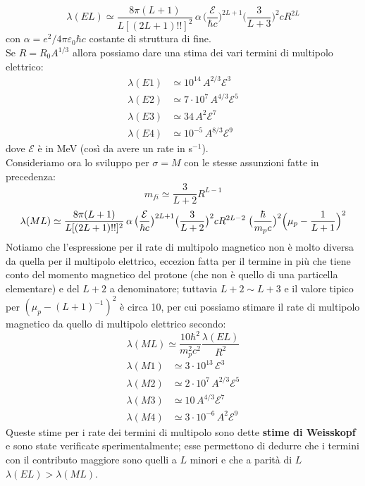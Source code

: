 $$\lambda(EL)\simeq \frac{8\pi(L+1)}{L[(2L+1)!!]^2}\,\alpha\,\bigl(\frac{\mathcal{E}}{\hbar c} \bigr)^{2L+1}\bigl(\frac{3}{L+3} \bigr)^2cR^{2L}$$
con $\alpha = e^2/4\pi\varepsilon_0\hbar c$ costante di struttura di fine.\\
Se $R=R_0A^{1/3}$ allora possiamo dare una stima dei vari termini di multipolo elettrico:
\begin{displaymath}
\begin{aligned}
\lambda(E1)&\simeq 10^{14} \, A^{2/3} \mathcal{E}^3 \\
\lambda(E2)&\simeq 7\cdot10^{7} \, A^{4/3} \mathcal{E}^5 \\
\lambda(E3)&\simeq 34 \, A^{2} \mathcal{E}^7 \\
\lambda(E4)&\simeq 10^{-5} \, A^{8/3} \mathcal{E}^9
\end{aligned}
\end{displaymath}
dove $\mathcal{E}$ è in MeV (così da avere un rate in s$^{-1}$).\\
Consideriamo ora lo sviluppo per $\sigma =M$ con le stesse assunzioni fatte in precedenza:
$$m_{fi}\simeq \frac{3}{L+2}R^{L-1}$$
$$\lambda(ML) \simeq \frac{8\pi(L+1)}{L[(2L+1)!!]^2}\,\alpha\,\bigl(\frac{\mathcal{E}}{\hbar c} \bigr)^{2L+1}\bigl(\frac{3}{L+2} \bigr)^2cR^{2L-2}\;\bigl(\frac{\hbar}{m_p c}\bigr)^2\Bigl ( \mu_p - \frac{1}{L+1} \Bigr )^2$$
Notiamo che l'espressione per il rate di multipolo magnetico non è molto diversa da quella per il multipolo elettrico, eccezion fatta per il termine in più che tiene conto del momento magnetico del protone (che non è quello di una particella elementare) e del $L+2$ a denominatore; tuttavia $L+2\sim L+3$ e il valore tipico per $(\mu_p-(L+1)^{-1})^2$ è circa 10, per cui possiamo stimare il rate di multipolo magnetico da quello di multipolo elettrico secondo:
$$\lambda (ML)\simeq \frac{10\hbar^2}{m_p^2c^2}\frac{\lambda(EL)}{R^2}$$
\begin{displaymath}
\begin{aligned}
\lambda(M1)&\simeq 3\cdot10^{13} \,  \mathcal{E}^3 \\
\lambda(M2)&\simeq 2\cdot10^{7} \, A^{2/3} \mathcal{E}^5 \\
\lambda(M3)&\simeq 10 \, A^{4/3} \mathcal{E}^7 \\
\lambda(M4)&\simeq 3\cdot10^{-6} \, A^{2} \mathcal{E}^9
\end{aligned}
\end{displaymath}
Queste stime per i rate dei termini di multipolo sono dette \textbf{stime di Weisskopf}\label{sec-stime-Weiss} e sono state verificate sperimentalmente; esse permettono di dedurre che i termini con il contributo maggiore sono quelli a $L$ minori e che a parità di $L$ $\lambda(EL)>\lambda(ML)$.

